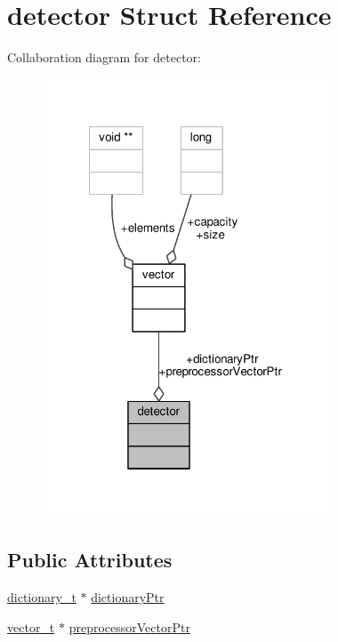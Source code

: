 \hypertarget{structdetector}{\section{detector Struct Reference}
\label{structdetector}
}


Collaboration diagram for detector\-:
\nopagebreak
\begin{figure}[H]
\begin{center}
\leavevmode
\includegraphics[width=242pt]{structdetector__coll__graph}
\end{center}
\end{figure}
\subsection*{Public Attributes}
\begin{DoxyCompactItemize}
\item 
\hyperlink{dictionary_8h_a372959a54aef1af6aef8c730cf051701}{dictionary\-\_\-t} $\ast$ \hyperlink{structdetector_afc48752bc3fb227fca35630a5113cb07}{dictionary\-Ptr}
\item 
\hyperlink{vector_8h_a5a1bca6fa9a3f18a2897623094d918da}{vector\-\_\-t} $\ast$ \hyperlink{structdetector_af89702c68d05dc14b1f6c83c6a5a59f1}{preprocessor\-Vector\-Ptr}
\end{DoxyCompactItemize}


